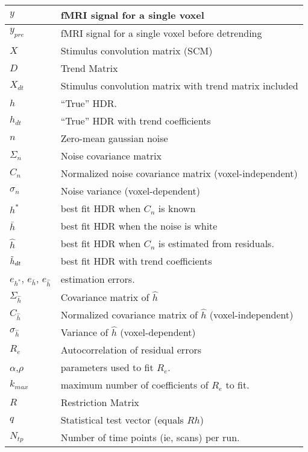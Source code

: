 \documentclass[12pt]{article}
\begin{document}
\begin{table}
\begin{center}
\begin{tabular}{|l|l|}\hline
$y$   & fMRI signal for a single voxel \\ \hline 
$y_{pre}$   & fMRI signal for a single voxel before detrending\\ \hline 
$X$   & Stimulus convolution matrix (SCM)\\ \hline 
$D$   & Trend Matrix\\ \hline 
$X_{dt}$   & Stimulus convolution matrix with trend matrix included\\ \hline 
$h$   & ``True'' HDR. \\ \hline 
$h_{dt}$   & ``True'' HDR with trend coefficients \\ \hline 
$n$ & Zero-mean gaussian noise  \\ \hline 
$\Sigma_n$  & Noise covariance matrix \\ \hline
$C_n$  & Normalized noise covariance matrix (voxel-independent) \\ \hline
$\sigma_n$  & Noise variance (voxel-dependent) \\ \hline
$h^*$ & best fit HDR when $C_n$  is known \\ \hline
$\bar{h}$ & best fit HDR when the noise is white \\ \hline
$\hat{h}$  & best fit HDR when $C_n$  is estimated from residuals.\\ \hline
$\Tilde{h}_{dt}$   & best fit HDR with trend coefficients \\ \hline 
$e_{h^*}$, $e_{\bar{h}}$, $e_{\hat{h}}$ & estimation errors. \\ \hline 
$\Sigma_{\hat{h}}$  &  Covariance matrix of  $\hat{h}$\\ \hline
$C_{\hat{h}}$  &  Normalized covariance matrix of  $\hat{h}$
           (voxel-independent) \\ \hline
$\sigma_{\hat{h}}$  & Variance of  $\hat{h}$ (voxel-dependent) \\ \hline
$R_e$ & Autocorrelation of residual errors \\ \hline
$\alpha$,$\rho$ & parameters used to fit $R_e$. \\ \hline
$k_{max}$ & maximum number of coefficients of $R_e$ to fit. \\ \hline
$R$ & Restriction Matrix \\ \hline
$q$ & Statistical test vector (equals $R h$) \\ \hline
$N_{tp}$ & Number of time points (ie, scans) per run.\\ \hline

\end{tabular}
\end{center}
\end{table}
\end{document}
